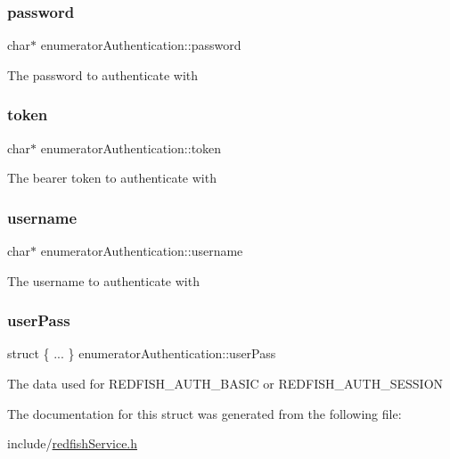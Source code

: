 \subsubsection{\texorpdfstring{password}{password}}
{\footnotesize\ttfamily char$\ast$ enumerator\+Authentication\+::password}

The password to authenticate with \mbox{\label{structenumeratorAuthentication_a13d0603779b5edc0bd2ed8dcf4d7a651}} 
\subsubsection{\texorpdfstring{token}{token}}
{\footnotesize\ttfamily char$\ast$ enumerator\+Authentication\+::token}

The bearer token to authenticate with \mbox{\label{structenumeratorAuthentication_a9a40303876fa5c0adaa29c1037c60d4c}} 
\subsubsection{\texorpdfstring{username}{username}}
{\footnotesize\ttfamily char$\ast$ enumerator\+Authentication\+::username}

The username to authenticate with \mbox{\label{structenumeratorAuthentication_aa203643dc4f82f99f59a42888722e615}} 
\subsubsection{\texorpdfstring{user\+Pass}{userPass}}
{\footnotesize\ttfamily struct \{ ... \}   enumerator\+Authentication\+::user\+Pass}

The data used for R\+E\+D\+F\+I\+S\+H\+\_\+\+A\+U\+T\+H\+\_\+\+B\+A\+S\+IC or R\+E\+D\+F\+I\+S\+H\+\_\+\+A\+U\+T\+H\+\_\+\+S\+E\+S\+S\+I\+ON 

The documentation for this struct was generated from the following file\+:\begin{DoxyCompactItemize}
\item 
include/\hyperlink{redfishService_8h}{redfish\+Service.\+h}\end{DoxyCompactItemize}
